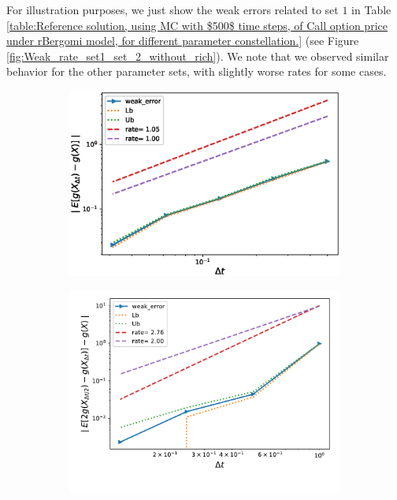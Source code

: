 \FloatBarrier

For illustration purposes, we just show the weak errors related to set $1$ in Table \ref{table:Reference solution, using MC with $500$ time steps, of Call option price under rBergomi model, for different parameter constellation.} (see Figure \ref{fig:Weak_rate_set1_set_2_without_rich}). We note that we observed similar behavior for the other parameter sets, with slightly worse rates for some cases.


\begin{figure}[h!]
	\centering
	\begin{subfigure}{.4\textwidth}
		\centering
		\includegraphics[width=1\linewidth]{./figures/rBergomi_weak_error_rates/without_richardson/H_007/weak_convergence_order_Bergomi_H_007_K_1_M_10_6_CI_relative}
		\caption{}
		\label{fig:sub3}
	\end{subfigure}%
	\begin{subfigure}{.4\textwidth}
		\centering
		\includegraphics[width=1\linewidth]{./figures/rBergomi_weak_error_rates/with_richardson/H_007/weak_convergence_order_Bergomi_H_007_K_1_richardson_relative_M_10_6}
		\caption{}
		\label{fig:sub4}
	\end{subfigure}
	

\end{figure}
